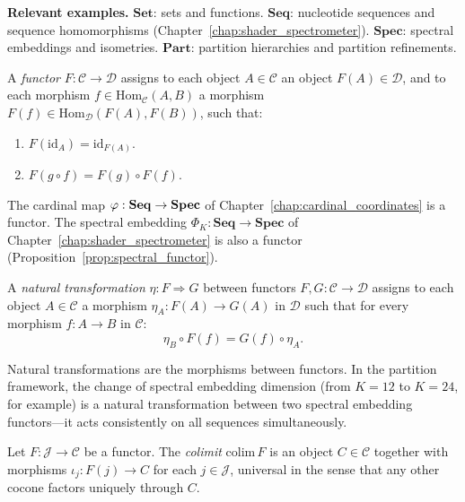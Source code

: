 \textbf{Relevant examples.} $\mathbf{Set}$: sets and functions.
$\mathbf{Seq}$: nucleotide sequences and sequence homomorphisms
(Chapter~\ref{chap:shader_spectrometer}). $\mathbf{Spec}$: spectral
embeddings and isometries. $\mathbf{Part}$: partition hierarchies and
partition refinements.

\begin{definition}[Functor]
A \emph{functor} $F : \mathcal{C} \to \mathcal{D}$ assigns to each object
$A \in \mathcal{C}$ an object $F(A) \in \mathcal{D}$, and to each morphism
$f \in \mathrm{Hom}_\mathcal{C}(A,B)$ a morphism $F(f) \in \mathrm{Hom}_\mathcal{D}(F(A),F(B))$,
such that:
\begin{enumerate}[label=(\roman*)]
  \item $F(\mathrm{id}_A) = \mathrm{id}_{F(A)}$.
  \item $F(g \circ f) = F(g) \circ F(f)$.
\end{enumerate}
\end{definition}

The cardinal map $\varphi : \mathbf{Seq} \to \mathbf{Spec}$ of
Chapter~\ref{chap:cardinal_coordinates} is a functor. The spectral embedding
$\Phi_K : \mathbf{Seq} \to \mathbf{Spec}$ of Chapter~\ref{chap:shader_spectrometer}
is also a functor (Proposition~\ref{prop:spectral_functor}).

\begin{definition}
A \emph{natural transformation} $\eta : F \Rightarrow G$ between functors
$F, G : \mathcal{C} \to \mathcal{D}$ assigns to each object $A \in \mathcal{C}$
a morphism $\eta_A : F(A) \to G(A)$ in $\mathcal{D}$ such that for every
morphism $f : A \to B$ in $\mathcal{C}$:
\[
  \eta_B \circ F(f) = G(f) \circ \eta_A.
\]
\end{definition}

Natural transformations are the morphisms between functors. In the partition
framework, the change of spectral embedding dimension (from $K=12$ to $K=24$,
for example) is a natural transformation between two spectral embedding
functors---it acts consistently on all sequences simultaneously.

\begin{definition}
Let $F : \mathcal{J} \to \mathcal{C}$ be a functor. The \emph{colimit}
$\mathrm{colim}\, F$ is an object $C \in \mathcal{C}$ together with morphisms
$\iota_j : F(j) \to C$ for each $j \in \mathcal{J}$, universal in the sense
that any other cocone factors uniquely through $C$.
\end{definition}

